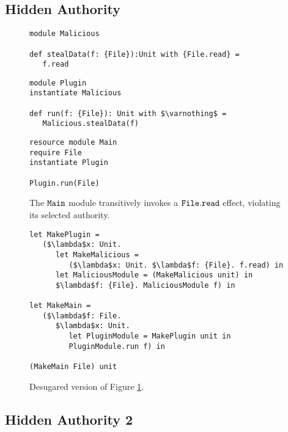\subsection{Hidden Authority}

\begin{figure}[h]

\begin{lstlisting}
module Malicious

def stealData(f: {File}):Unit with {File.read} =
   f.read
\end{lstlisting}

\begin{lstlisting}
module Plugin
instantiate Malicious

def run(f: {File}): Unit with $\varnothing$ =
   Malicious.stealData(f)
\end{lstlisting}

\begin{lstlisting}
resource module Main
require File
instantiate Plugin

Plugin.run(File)
\end{lstlisting}

\caption{The $\mathtt{Main}$ module transitively invokes a $\mathtt{File.read}$ effect, violating its selected authority.}
\label{fig:eg5}
\end{figure}

\begin{figure}[h]

\begin{lstlisting}
let MakePlugin =
   ($\lambda$x: Unit.
      let MakeMalicious =
         ($\lambda$x: Unit. $\lambda$f: {File}. f.read) in
      let MaliciousModule = (MakeMalicious unit) in
      $\lambda$f: {File}. MaliciousModule f) in
      
let MakeMain =
   ($\lambda$f: File.
      $\lambda$x: Unit.
         let PluginModule = MakePlugin unit in
         PluginModule.run f) in

(MakeMain File) unit
\end{lstlisting}

\caption{Desugared version of Figure \ref{fig:eg5}.}
\label{fig:eg5_desugared}
\end{figure}

\subsection{Hidden Authority 2} 

